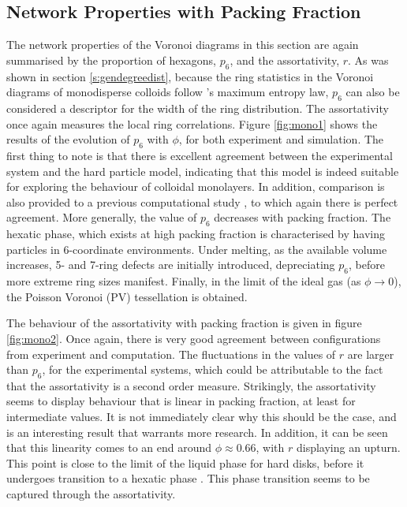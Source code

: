 \subsection{Network Properties with Packing Fraction}

The network properties of the Voronoi diagrams in this section are again summarised by the proportion of hexagons, $p_6$, and the assortativity, $r$.
As was shown in section \ref{s:gendegreedist}, because the ring statistics in the Voronoi diagrams of monodisperse \qtd{} colloids follow \lm's maximum entropy law, $p_6$ can also be considered a descriptor for the width of the ring distribution.
The assortativity once again measures the local ring correlations.
Figure \ref{fig:mono1} shows the results of the evolution of $p_6$ with $\phi$, for both experiment and simulation.
The first thing to note is that there is excellent agreement between the experimental system and the hard particle model, indicating that this model is indeed suitable for exploring the behaviour of colloidal monolayers.
In addition, comparison is also provided to a previous computational study \cite{Kumar2005}, to which again there is perfect agreement.
More generally, the value of $p_6$ decreases with packing fraction.
The hexatic phase, which exists at high packing fraction is characterised by having particles in 6\--coordinate environments.
Under melting, as the available volume increases, 5\-- and 7\--ring defects are initially introduced, depreciating $p_6$, before more extreme ring sizes manifest.
Finally, in the limit of the ideal gas (as $\phi\rightarrow 0$), the Poisson Voronoi (PV) tessellation is obtained.

The behaviour of the assortativity with packing fraction is given in figure \ref{fig:mono2}.
Once again, there is very good agreement between configurations from experiment and computation.
The fluctuations in the values of $r$ are larger than $p_6$, for the experimental systems, which could be attributable to the fact that the assortativity is a second order measure.
Strikingly, the assortativity seems to display behaviour that is linear in packing fraction, at least for intermediate values.
It is not immediately clear why this should be the case, and is an interesting result that warrants more research.
In addition, it can be seen that this linearity comes to an end around $\phi\approx 0.66$, with $r$ displaying an upturn.
This point is close to the limit of the liquid phase for hard disks, before it undergoes transition to a hexatic phase \cite{Thorneywork2017}.
This phase transition seems to be captured through the assortativity.

